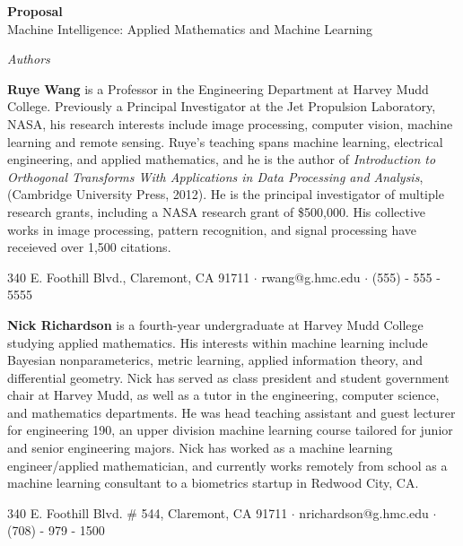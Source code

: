\documentclass[10pt]{article}
\newenvironment{changemargin}[2]{%
\begin{list}{}{%
\setlength{\topsep}{0pt}%
\setlength{\leftmargin}{#1}%
\setlength{\rightmargin}{#2}%
\setlength{\listparindent}{\parindent}%
\setlength{\itemindent}{\parindent}%
\setlength{\parsep}{\parskip}%
}%
\item[]}{\end{list}}
\begin{document}
\begin{changemargin}{+-1cm}{-3cm}
\noindent
\large{\textbf{Proposal}}\\

\large{Machine Intelligence: Applied Mathematics and Machine Learning}\\
\small

\noindent
\textit{Authors}
\begin{changemargin}{1cm}{0cm}
\textbf{Ruye Wang} is a Professor in the Engineering Department at Harvey Mudd College. Previously a Principal Investigator at the Jet Propulsion Laboratory, NASA, his research interests include image processing, computer vision, machine learning and remote sensing. Ruye's teaching spans machine learning, electrical engineering, and applied mathematics, and he is the author of \textit{Introduction to Orthogonal Transforms With Applications in Data Processing and Analysis}, (Cambridge University Press, 2012). He is the principal investigator of multiple research grants, including a NASA research grant of \$500,000. His collective works in image processing, pattern recognition, and signal processing have receieved over 1,500 citations.

\begin{center}
340 E. Foothill Blvd., Claremont, CA 91711 $\cdot$ rwang@g.hmc.edu $\cdot$ (555) - 555 - 5555 \\
\end{center}

\textbf{Nick Richardson} is a fourth-year undergraduate at Harvey Mudd College studying applied mathematics. His interests within machine learning include Bayesian nonparameterics, metric learning, applied information theory, and differential geometry. Nick has served as class president and student government chair at Harvey Mudd, as well as a tutor in the engineering, computer science, and mathematics departments. He was head teaching assistant and guest lecturer for engineering 190, an upper division machine learning course tailored for junior and senior engineering majors. Nick has worked as a machine learning engineer/applied mathematician, and currently works remotely from school as a machine learning consultant to a biometrics startup in Redwood City, CA.

\begin{center}
340 E. Foothill Blvd. \# 544, Claremont, CA 91711 $\cdot$ nrichardson@g.hmc.edu $\cdot$ (708) - 979 - 1500
\end{center}

\end{changemargin}


\end{changemargin}
\end{document}
